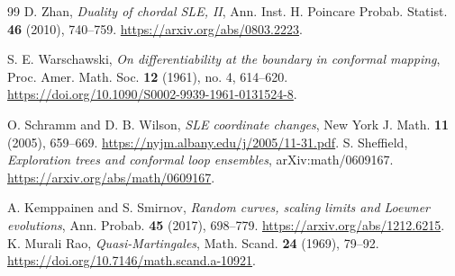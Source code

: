 \documentclass[11pt]{article}
\theoremstyle{definition}\newtheorem{definition}[theorem]{Definition}
\theoremstyle{remark}\newtheorem{remark}[theorem]{Remark}
\begin{document}
\begin{thebibliography}{99}
 D. Zhan,
\emph{Duality of chordal SLE, II},
Ann. Inst. H. Poincare Probab. Statist. \textbf{46} (2010), 740--759.
\url{https://arxiv.org/abs/0803.2223}.

 S. E. Warschawski,
\emph{On differentiability at the boundary in conformal mapping},
Proc. Amer. Math. Soc. \textbf{12} (1961), no. 4, 614--620.
\url{https://doi.org/10.1090/S0002-9939-1961-0131524-8}.

 O. Schramm and D. B. Wilson,
\emph{SLE coordinate changes}, New York J. Math. \textbf{11} (2005), 659--669.
\url{https://nyjm.albany.edu/j/2005/11-31.pdf}.
 S. Sheffield,
\emph{Exploration trees and conformal loop ensembles}, arXiv:math/0609167.
\url{https://arxiv.org/abs/math/0609167}.

 A. Kemppainen and S. Smirnov,
\emph{Random curves, scaling limits and Loewner evolutions},
Ann. Probab. \textbf{45} (2017), 698--779.
\url{https://arxiv.org/abs/1212.6215}.
 K. Murali Rao, \emph{Quasi-Martingales},
Math. Scand. \textbf{24} (1969), 79--92.
\url{https://doi.org/10.7146/math.scand.a-10921}.


\end{thebibliography}
\end{document}
